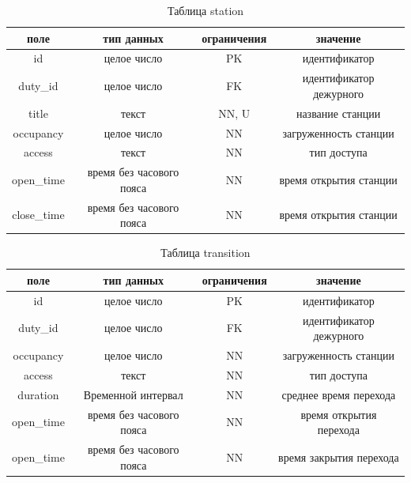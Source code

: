 \begin{table}[H]
    \begin{center}
        \caption{Таблица station}
        \label{tbl:station}
        \begin{tabular}{|c|c|c|c|}
            \hline
            поле & тип данных & ограничения & значение \\
            \hline
            id & целое число & PK & идентификатор \\
            \hline
            duty\_id & целое число & FK & идентификатор дежурного \\
            \hline
            title & текст & NN, U & название станции \\
            \hline
            occupancy & целое число & NN & загруженность станции \\
            \hline
            access & текст & NN & тип доступа \\
            \hline
            open\_time & время без часового пояса & NN & время открытия станции \\
            \hline
            close\_time & время без часового пояса & NN & время открытия станции \\
            \hline
        \end{tabular}
    \end{center}    
\end{table}

\begin{table}[H]
    \begin{center}
        \caption{Таблица transition}
        \label{tbl:transition}
        \begin{tabular}{|c|c|c|c|}
            \hline
            поле & тип данных & ограничения & значение \\
            \hline
            id & целое число & PK & идентификатор \\
            \hline
            duty\_id & целое число & FK & идентификатор дежурного \\
            \hline
            occupancy & целое число & NN & загруженность станции \\
            \hline
            access & текст & NN & тип доступа \\
            \hline
            duration & Временной интервал & NN & среднее время перехода \\
            \hline
            open\_time & время без часового пояса & NN & время открытия перехода \\
            \hline
            open\_time & время без часового пояса & NN & время закрытия перехода \\
            \hline
        \end{tabular}
    \end{center}    
\end{table}

